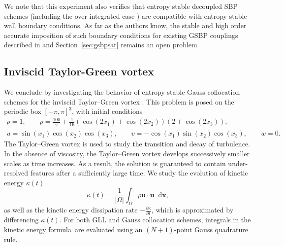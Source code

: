\documentclass[review,onefignum,onetabnum,final]{siamart171218}
\newcommand{\pd}[2]{\frac{\partial#1}{\partial#2}}
\newcommand{\LRp}[1]{\left( #1 \right)}
\newcommand{\LRb}[1]{\left| #1 \right|}
\newcommand*\diff[1]{\mathop{}\!{\mathrm{d}#1}}
\begin{document}
We note that this experiment also verifies that entropy stable decoupled SBP schemes (including the over-integrated case \cite{chan2017discretely}) are compatible with entropy stable wall boundary conditions.  As far as the authors know, the stable and high order accurate imposition of such boundary conditions for existing GSBP couplings described in \cite{crean2017high} and Section~\ref{sec:gsbpsat} remains an open problem.  

\subsection{Inviscid Taylor-Green vortex}

We conclude by investigating the behavior of entropy stable Gauss collocation schemes for the inviscid Taylor--Green vortex \cite{ae1937mechanism, gassner2016split, crean2018entropy}.  This problem is posed on the periodic box $[-\pi,\pi]^3$, with initial conditions 
\begin{gather*}
\rho = 1, \qquad p = \frac{100}{\gamma} + \frac{1}{16} \LRp{\cos(2x_1) + \cos(2x_2)}\LRp{2+\cos(2x_3)},\\
u = \sin(x_1)\cos(x_2)\cos(x_3), \qquad
v = -\cos(x_1)\sin(x_2)\cos(x_3),\qquad
w= 0.
\end{gather*}
The Taylor--Green vortex is used to study the transition and decay of turbulence.  In the absence of viscosity, the Taylor--Green vortex develops successively smaller scales as time increases.  As a result, the solution is guaranteed to contain under-resolved features after a sufficiently large time.  We study the evolution of kinetic energy $\kappa(t)$ 
\[
\kappa(t) =\frac{1}{\LRb{\Omega}} \int_{\Omega} \rho \bm{u}\cdot\bm{u} \diff{\bm{x}},
\]
as well as the kinetic energy dissipation rate $-\pd{\kappa}{t}$, which is approximated by differencing $\kappa(t)$.  For both GLL and Gauss collocation schemes, integrals in the kinetic energy formula are evaluated using an $(N+1)$-point Gauss quadrature rule.
\end{document}
